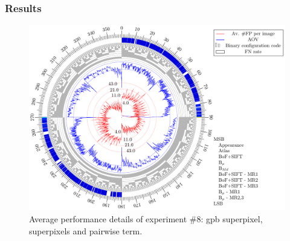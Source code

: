 \begin{frame}[plain]\frametitle{Results}
\begin{figure}[Htbp]
\centering
\includegraphics[height=.85\textheight]{roses/discresultsGPB.pdf}
\caption{Average performance details of experiment \#8: \ac{gpb} superpixel, superpixels and pairwise term. }
\end{figure}
\end{frame}


%


